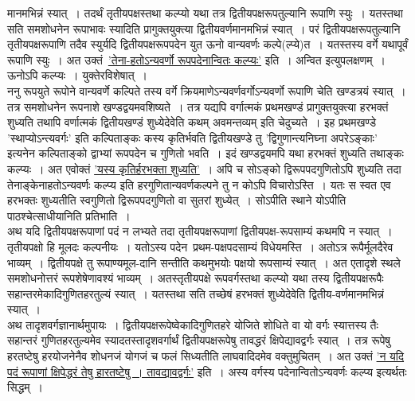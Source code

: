 \documentclass[11pt, openany]{book}
\begin{document}
\newpage

\begin{sloppypar}
\noindent मानमभिन्नं स्यात्~। तदर्थं तृतीयपक्षस्तथा कल्प्यो यथा तत्र द्वितीयपक्षरूपतुल्यानि रूपाणि स्युः~। यतस्तथा सति समशोधनेन रूपाभावः स्यादिति प्रागुक्तयुक्त्या द्वितीयवर्णमानमभिन्नं स्यात्~। परं द्वितीयपक्षरूपतुल्यानि तृतीयपक्षरूपाणि तदैव स्युर्यदि द्वितीयपक्षरूपपदेन युत ऊनो वान्यवर्णः कल्पे(ल्प्ये)त~। यतस्तस्य वर्गे यथापूर्वं रूपाणि स्युः~। अत उक्तं~\hyperref[10.176]{'तेना-हतोऽन्यवर्णो रूपपदेनान्वितः कल्प्यः'} इति~। अन्वित इत्युपलक्षणम्~। ऊनोऽपि कल्प्यः~। युक्तेरविशेषात्~।\\

ननु रूपयुते रूपोने वान्यवर्णे कल्पिते तस्य वर्गे क्रियमाणेऽन्यवर्णवर्गोऽन्यवर्णो रूपाणि चेति खण्डत्रयं स्यात्~। तत्र समशोधनेन रूपनाशे खण्डद्वयमवशिष्यते~। तत्र यद्यपि वर्गात्मकं प्रथमखण्डं प्रागुक्तयुक्त्या हरभक्तं शुध्यति तथापि वर्णात्मकं द्वितीयखण्डं शुध्येदेवेति कथम् अवमन्तव्यम् इति चेदुच्यते~। इह प्रथमखण्डे {\color{violet}'स्थाप्योऽन्त्यवर्गः'} इति कल्पिताङ्कः कस्य कृतिर्भवति द्वितीयखण्डे तु {\color{violet}'द्विगुणान्त्यनिघ्ना अपरेऽङ्काः'} इत्यनेन कल्पिताङ्को द्वाभ्यां रूपपदेन च गुणितो भवति~। इदं खण्डद्वयमपि यथा हरभक्तं शुध्यति तथाङ्कः कल्प्यः~। अत एवोक्तं \hyperref[10.176]{'यस्य कृतिर्हरभक्ता शुध्यति'}~। अपि च सोऽङ्को द्विरूपपदगुणितोऽपि शुध्यति तदा तेनाङ्केनाहतोऽन्यवर्णः कल्प्य इति हरगुणितान्यवर्णकल्पने तु न कोऽपि विचारोऽस्ति~। यतः स स्वत एव हरभक्तः शुध्यतीति स्वगुणितो द्विरूपपदगुणितो वा सुतरां शुध्येत्~। सोऽपीति स्थाने योऽपीति पाठश्चेत्साधीयानिति प्रतिभाति~।\\

अथ यदि द्वितीयपक्षरूपाणां पदं न लभ्यते तदा तृतीयपक्षरूपाणां द्वितीयपक्ष-रूपसाम्यं कथमपि न स्यात्~। तृतीयपक्षो हि मूलदः कल्पनीयः~। यतोऽस्य पदेन~प्रथम-पक्षपदसाम्यं विधेयमस्ति~। अतोऽत्र रूपैर्मूलदैरेव भाव्यम्~। द्वितीयपक्षे तु रूपाण्यमूल-दानि सन्तीति कथमुभयोः पक्षयो रूपसाम्यं स्यात्~। अत एतादृशे स्थले समशोधनोत्तरं रूपशेषेणावश्यं भाव्यम्~। अतस्तृतीयपक्षे रूपवर्गस्तथा कल्प्यो यथा तस्य द्वितीयपक्षरूपैः सहान्तरमेकादिगुणितहरतुल्यं स्यात्~। यतस्तथा सति तच्छेषं हरभक्तं शुध्येदेवेति द्वितीय-वर्णमानमभिन्नं स्यात्~।\\

अथ तादृशवर्गज्ञानार्थमुपायः~। द्वितीयपक्षरूपेष्वेकादिगुणितहरे योजिते शोधिते वा यो वर्गः स्यात्तस्य तैः सहान्तरं गुणितहरतुल्यमेव स्यादतस्तादृशवर्गार्थं द्वितीयपक्षरूपेषु तावद्धरं क्षिपेद्यावद्वर्गः स्यात्~। तत्र रूपेषु हरतष्टेषु हरयोजनेनैव शोधनजं योगजं च फलं सिध्यतीति लाघवादिदमेव वक्तुमुचितम्~। अत उक्तं \hyperref[10.176]{'न यदि पदं रूपाणां क्षिपेद्धरं तेषु हारतष्टेषु~। तावद्यावद्वर्गः'} इति~। अस्य वर्गस्य पदेनान्वितोऽन्यवर्णः कल्प्य इत्यर्थतः सिद्धम्~।
\end{sloppypar}
\end{document}
